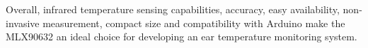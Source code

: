 Overall, infrared temperature sensing capabilities, accuracy, easy availability, non-invasive measurement, compact size and compatibility with Arduino make the MLX90632 an ideal choice for developing an ear temperature monitoring system.





